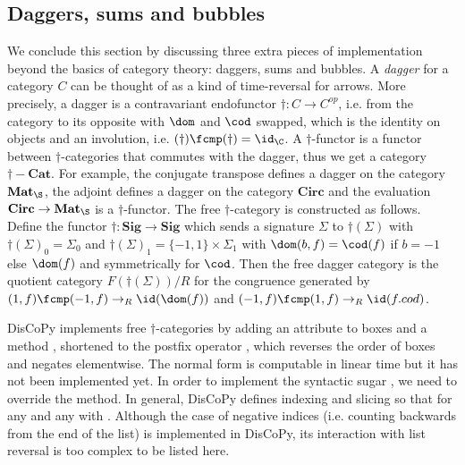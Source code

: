 \subsection{Daggers, sums and bubbles}

We conclude this section by discussing three extra pieces of implementation beyond the basics of category theory: daggers, sums and bubbles.
A \emph{dagger} for a category $C$ can be thought of as a kind of time-reversal for arrows.
More precisely, a dagger is a contravariant endofunctor $\dagger : C \to C^{op}$, i.e. from the category to its opposite with $\dom$ and $\cod$ swapped, which is the identity on objects and an involution, i.e. $(\dagger) \fcmp (\dagger) = \id_\C$.
A $\dagger$-functor is a functor between $\dagger$-categories that commutes with the dagger, thus we get a category $\dagger-\mathbf{Cat}$.
For example, the conjugate transpose defines a dagger on the category $\mathbf{Mat}_\S$, the adjoint defines a dagger on the category $\mathbf{Circ}$ and the evaluation $\mathbf{Circ} \to \mathbf{Mat}_\S$ is a $\dagger$-functor.
The free $\dagger$-category is constructed as follows.
Define the functor $\dagger : \mathbf{Sig} \to \mathbf{Sig}$ which sends a signature $\Sigma$ to $\dagger(\Sigma)$ with
$\dagger(\Sigma)_0 = \Sigma_0$ and $\dagger(\Sigma)_1 = \{ -1, 1 \} \times \Sigma_1$ with $\dom(b, f) = \cod(f)$ if $b = -1$ else $\dom(f)$ and symmetrically for $\cod$.
Then the free dagger category is the quotient category $F(\dagger(\Sigma)) / R$ for the congruence generated by $(1, f) \fcmp (-1, f) \to_R \id(\dom(f))$ and $(-1, f) \fcmp (1, f) \to_R \id(f.cod)$.

DisCoPy implements free $\dagger$-categories by adding an attribute  to boxes and a method , shortened to the postfix operator \py{[::-1]}, which reverses the order of boxes and negates  elementwise.
The normal form is computable in linear time but it has not been implemented yet.
In order to implement the syntactic sugar , we need to override the  method.
In general, DisCoPy defines indexing  and slicing  so that  for any  and any  with .
Although the case of negative indices (i.e. counting backwards from the end of the list) is implemented in DisCoPy, its interaction with list reversal is too complex to be listed here.

